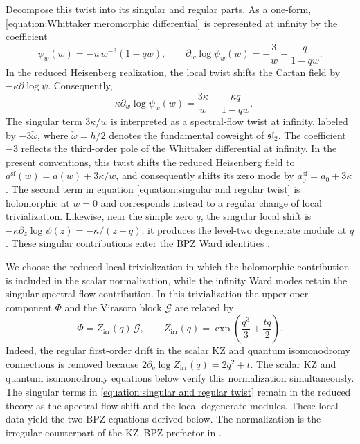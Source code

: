 \documentclass[a4paper,11pt]{article}
\numberwithin{equation}{section}
\begin{document}
 Decompose this twist into its singular and regular parts.  As a one-form,
 \eqref{equation:Whittaker meromorphic differential}
is represented at infinity by the coefficient
\begin{equation}
 \psi_{w}(w)=-u\,w^{-3}(1-qw),
 \qquad
 \partial_{w}\log\psi_{w}(w)
 =-\frac{3}{w}-\frac{q}{1-qw}.
\end{equation}
In the reduced Heisenberg realization, the local twist shifts the
Cartan field by $-\kappa\partial\log\psi$.  Consequently,
\begin{equation}
 \label{equation:singular and regular twist}
 -\kappa\partial_{w}\log\psi_{w}(w)
 =\frac{3\kappa}{w}+\frac{\kappa q}{1-qw}.
\end{equation}
The singular term $3\kappa/w$ is interpreted as a spectral-flow twist at infinity, labeled by $-3\check{\omega}$, where $\check{\omega}=h/2$ denotes the fundamental coweight of $\mathfrak{sl}_2$. The coefficient $-3$ reflects the third-order pole of the Whittaker differential at infinity. In the present conventions, this twist shifts the reduced Heisenberg field to $a^{\mathrm{sf}}(w)=a(w)+3\kappa/w$, and consequently shifts its zero mode by $a_0^{\mathrm{sf}}=a_0+3\kappa$. The second term in equation \eqref{equation:singular and regular twist} is holomorphic at $w=0$ and corresponds instead to a regular change of local trivialization. Likewise, near the simple zero $q$, the singular local shift is
 $-\kappa\partial_{z}\log\psi(z)=-\kappa/(z-q)$; it produces the
 level-two degenerate module at $q$.  These singular contributions enter
 the BPZ Ward identities \cite{ArakawaFrenkel2019,GaiottoLamyPoirier2013}.

We choose the reduced local trivialization in which the holomorphic
contribution is included in the scalar normalization, while the
infinity Ward modes retain the singular spectral-flow contribution.
In this trivialization the upper oper component $\Phi$ and the
Virasoro block $\mathcal{G}$ are related by
\begin{equation}
\Phi=Z_{\mathrm{irr}}(q)\,\mathcal{G},
 \qquad
 Z_{\mathrm{irr}}(q)
 =\exp\left(\frac{q^{3}}{3}+\frac{tq}{2}\right).
\end{equation}
Indeed, the regular first-order drift in the scalar KZ and quantum isomonodromy
connections is removed because
$2\partial_{q}\log Z_{\mathrm{irr}}(q)=2q^{2}+t$.
The scalar KZ and quantum isomonodromy equations below verify this normalization
simultaneously.  The singular terms in \eqref{equation:singular and regular twist}
remain in the reduced theory as the spectral-flow shift and the local
degenerate modules.  These local data yield the two BPZ equations derived below.  The
normalization is the irregular counterpart of the KZ--BPZ prefactor in
\cite{RibaultTeschner2005,GaiottoLamyPoirier2013}.
\end{document}
